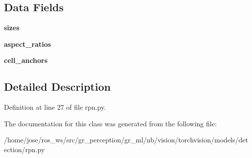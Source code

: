 \subsection*{Data Fields}
\begin{DoxyCompactItemize}
\item 
\mbox{\label{classtorchvision_1_1models_1_1detection_1_1rpn_1_1AnchorGenerator_afd8b8d1bb3aaae5fa592df4dc5178451}} 
{\bfseries sizes}
\item 
\mbox{\label{classtorchvision_1_1models_1_1detection_1_1rpn_1_1AnchorGenerator_ac02bffc42b572cc938d3fcff0d9bde7e}} 
{\bfseries aspect\+\_\+ratios}
\item 
\mbox{\label{classtorchvision_1_1models_1_1detection_1_1rpn_1_1AnchorGenerator_a10f0af36916c276ae4c1ddac2b499548}} 
{\bfseries cell\+\_\+anchors}
\end{DoxyCompactItemize}


\subsection{Detailed Description}


Definition at line 27 of file rpn.\+py.



The documentation for this class was generated from the following file\+:\begin{DoxyCompactItemize}
\item 
/home/jose/ros\+\_\+ws/src/gr\+\_\+perception/gr\+\_\+ml/nb/vision/torchvision/models/detection/rpn.\+py\end{DoxyCompactItemize}
